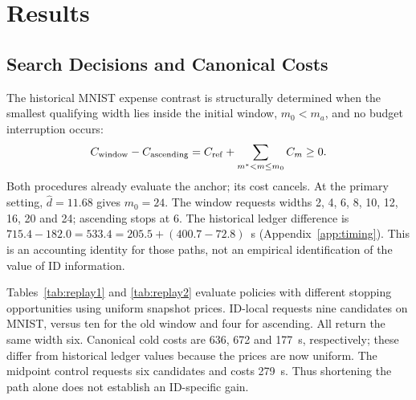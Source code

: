 \documentclass[make,article,submit,pdftex,moreauthors]{Definitions/mdpi}
\begin{document}
\section{Results}\label{sec:results}

\subsection{Search Decisions and Canonical Costs}\label{sec:replayresults}
The historical MNIST expense contrast is structurally determined when
the smallest qualifying width lies inside the initial window,
$m_0<m_a$, and no budget interruption occurs:
\begin{equation}
 C_{\rm window}-C_{\rm ascending}
 =C_{\rm ref}+\sum_{m^*<m\le m_0}C_m\ge0.
 \label{eq:dominance}
\end{equation}
Both procedures already evaluate the anchor; its cost cancels.
At the primary setting, $\hat d=11.68$ gives $m_0=24$.
The window requests widths 2, 4, 6, 8, 10, 12, 16, 20 and 24;
ascending stops at 6. The historical ledger difference is
$715.4-182.0=533.4=205.5+(400.7-72.8)$~s
(Appendix~\ref{app:timing}). This is an accounting identity for those
paths, not an empirical identification of the value of ID information.

Tables~\ref{tab:replay1} and \ref{tab:replay2} evaluate policies with
different stopping opportunities using uniform snapshot prices.
ID-local requests nine candidates on MNIST, versus ten for the old
window and four for ascending. All return the same width six.
Canonical cold costs are 636, 672 and 177~s, respectively; these differ
from historical ledger values because the prices are now uniform.
The midpoint control requests six candidates and costs 279~s.
Thus shortening the path alone does not establish an ID-specific gain.
\end{document}
